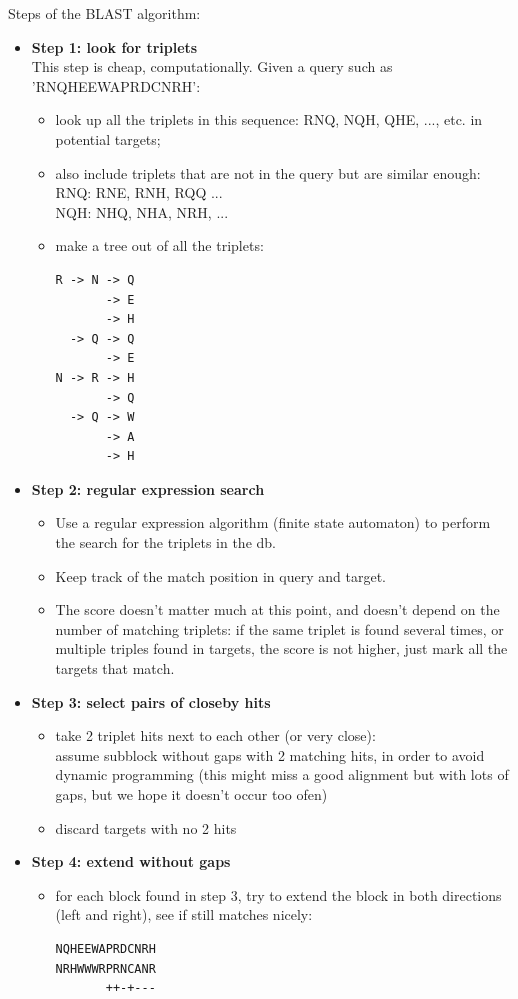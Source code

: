 Steps of the BLAST algorithm:
\begin{itemize}
\item {\bf Step 1: look for triplets} \\
  This step is cheap, computationally.
  Given a query such as 'RNQHEEWAPRDCNRH':
  \begin{itemize}
  \item look up all the triplets in this sequence: RNQ, NQH, QHE, ..., etc. in potential targets;
  \item also include triplets that are not in the query but are similar enough: \\
    RNQ: RNE, RNH, RQQ ... \\
    NQH: NHQ, NHA, NRH, ...
  \item make a tree out of all the triplets:
\begin{verbatim}
R -> N -> Q
       -> E
       -> H
  -> Q -> Q
       -> E
N -> R -> H
       -> Q
  -> Q -> W
       -> A
       -> H
\end{verbatim}
  \end{itemize}
\item {\bf Step 2: regular expression search}
  \begin{itemize}
  \item Use a regular expression algorithm (finite state automaton) to perform the search for the triplets in the db.
  \item Keep track of the match position in query and target.
  \item The score doesn't matter much at this point, and doesn't depend on the number of matching triplets: if the same triplet is found several times, or multiple triples found in targets, the score is not higher, just mark all the targets that match.
  \end{itemize}

\item {\bf Step 3: select pairs of closeby hits}
  \begin{itemize}
  \item take 2 triplet hits next to each other (or very close): \\
  assume subblock without gaps with 2 matching hits, in order to avoid dynamic programming
(this might miss a good alignment but with lots of gaps, but we hope it doesn't occur too ofen)
  \item discard targets with no 2 hits
  \end{itemize}

\item {\bf Step 4: extend without gaps}
  \begin{itemize}
  \item for each block found in step 3, try to extend the block in both directions (left and right), see if still matches nicely:
%
\begin{verbatim}
NQHEEWAPRDCNRH
NRHWWWRPRNCANR
       ++-+---


\end{verbatim}
\end{itemize}
\end{itemize}
